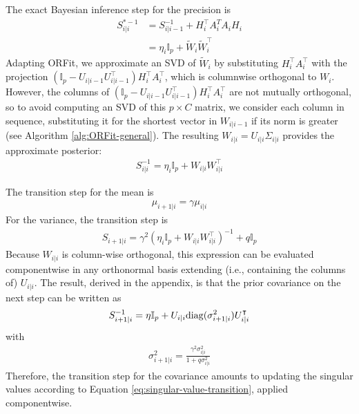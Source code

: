 The exact Bayesian inference step for the precision is
\begin{align}
S_{i\vert i}^{*-1} & =S_{i\vert i-1}^{-1}+H_{i}^{\top}A_{i}^{T}A_{i}H_{i}\\
 & =\eta_{i}\mathbb{I}_{p}+\tilde{W}_{i}\tilde{W}_{i}^{\top}
\end{align}
Adapting ORFit, we approximate an SVD of $\tilde{W}_{i}$ by substituting $H_{i}^{\top}A_{i}^{\top}$ with the projection
$\left(\mathbb{I}_{p}-U_{i\vert i-1}U_{i\vert i-1}^{\top}\right)H_{i}^{\top}A_{i}^{\top}$, which is columnwise orthogonal to $W_i$.
However, the columns of $\left(\mathbb{I}_{p}-U_{i\vert i-1}U_{i\vert i-1}^{\top}\right)H_{i}^{\top}A_{i}^{\top}$ are not mutually orthogonal,
so to avoid computing an SVD of this $p\times C$ matrix, we consider each column in sequence, substituting it for the shortest vector in $W_{i\vert i-1}$
if its norm is greater (see Algorithm \cref{alg:ORFit-general}). 
The resulting $W_{i\vert i}=U_{i\vert i}\Sigma_{i\vert i}$ provides the approximate posterior:
\begin{align}
S_{i\vert i}^{-1}=\eta_{i}\mathbb{I}_{p}+W_{i\vert i}W_{i\vert i}^{\top}
\end{align}

The transition step for the mean is 
\begin{align}
\mu_{i+1\vert i}=\gamma\mu_{i\vert i}
\end{align}
For the variance, the transition step is
\begin{align}
S_{i+1\vert i}=\gamma^{2}\left(\eta_{i}\mathbb{I}_{p}+W_{i\vert i}W_{i\vert i}^{\top}\right)^{-1}+q\mathbb{I}_{p}
\end{align}
Because $W_{i\vert i}$ is column-wise orthogonal, this expression can be evaluated
componentwise in any orthonormal basis extending (i.e., containing the columns of) $U_{i\vert i}$. 
The result, derived in the appendix, is that the prior covariance on the next step can be written as
\begin{align}
    S_{i+1|i}^{-1} = \eta\mathbb{I}_p + U_{i|i}\mathrm{diag}(\sigma^2_{i+1|i})U_{i|i}^\intercal
\end{align}
with
\begin{align}
\sigma_{i+1\vert i}^{2}=\frac{\gamma^{2}\sigma_{i\vert i}^{2}}{1+q\sigma_{i\vert i}^{2}}
\label{eq:singular-value-transition}
\end{align}
Therefore, the transition step for the covariance amounts to updating the singular values according to Equation \eqref{eq:singular-value-transition}, applied componentwise.

